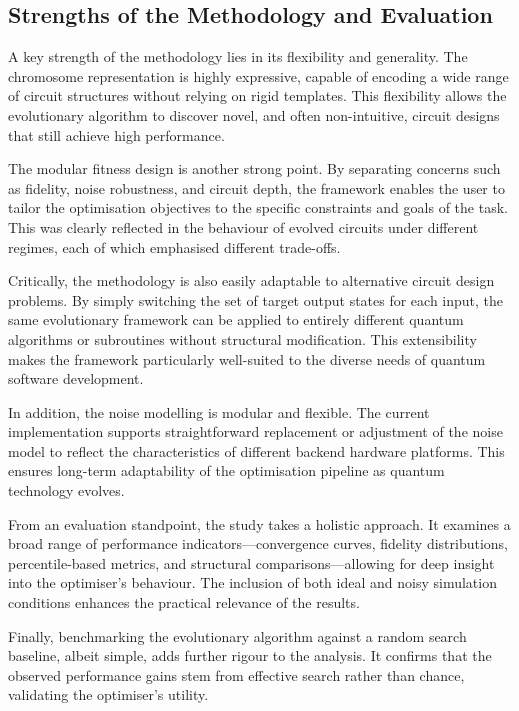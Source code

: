 \documentclass[11pt,a4paper]{article}
\begin{document}
\subsection{Strengths of the Methodology and Evaluation}\label{sec:strengths}
A key strength of the methodology lies in its flexibility and generality. The chromosome representation is highly expressive, capable of encoding a wide range of circuit structures without relying on rigid templates. This flexibility allows the evolutionary algorithm to discover novel, and often non-intuitive, circuit designs that still achieve high performance.\newline

The modular fitness design is another strong point. By separating concerns such as fidelity, noise robustness, and circuit depth, the framework enables the user to tailor the optimisation objectives to the specific constraints and goals of the task. This was clearly reflected in the behaviour of evolved circuits under different regimes, each of which emphasised different trade-offs.\newline

Critically, the methodology is also easily adaptable to alternative circuit design problems. By simply switching the set of target output states for each input, the same evolutionary framework can be applied to entirely different quantum algorithms or subroutines without structural modification. This extensibility makes the framework particularly well-suited to the diverse needs of quantum software development.\newline

In addition, the noise modelling is modular and flexible. The current implementation supports straightforward replacement or adjustment of the noise model to reflect the characteristics of different backend hardware platforms. This ensures long-term adaptability of the optimisation pipeline as quantum technology evolves.\newline

From an evaluation standpoint, the study takes a holistic approach. It examines a broad range of performance indicators—convergence curves, fidelity distributions, percentile-based metrics, and structural comparisons—allowing for deep insight into the optimiser’s behaviour. The inclusion of both ideal and noisy simulation conditions enhances the practical relevance of the results.\newline

Finally, benchmarking the evolutionary algorithm against a random search baseline, albeit simple, adds further rigour to the analysis. It confirms that the observed performance gains stem from effective search rather than chance, validating the optimiser’s utility.
\end{document}

